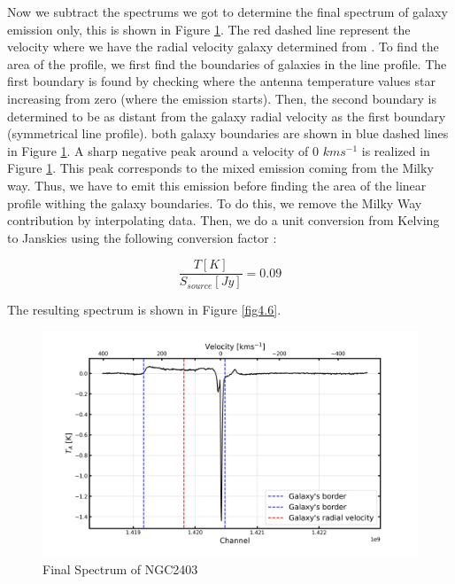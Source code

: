 \documentclass[12pt]{article}
\begin{document}
Now we subtract the spectrums we got to determine the final spectrum of galaxy emission only, this is shown in Figure \ref{fig4.5}. The red dashed line represent the velocity where we have the radial velocity galaxy determined from \cite{survey}.  
To find the area of the profile, we first find the boundaries of galaxies in the line profile. The first boundary is found by checking where the antenna temperature values star increasing from zero (where the emission starts). Then, the second boundary is determined to be as distant from the galaxy radial velocity as the first boundary (symmetrical line profile). both galaxy boundaries are shown in blue dashed lines in Figure \ref{fig4.5}. A sharp negative peak around a velocity of 0 $km s^{-1}$ is realized in Figure \ref{fig4.5}. This peak corresponds to the mixed emission coming from the Milky way. Thus, we have to emit this emission before finding the area of the linear profile withing the galaxy boundaries. To do this, we remove the Milky Way contribution by interpolating data. Then, we do a unit conversion from Kelving to Janskies using the following conversion factor \cite{lecturenote}:

\begin{equation}
    \frac{T[K]}{S_{source}[Jy]} = 0.09 
\end{equation}

The resulting spectrum is shown in Figure \ref{fig4.6}. 

\begin{figure}[H]
    \centering
    \includegraphics[width = \textwidth]{fig/sub.png}
    \caption{Final Spectrum of NGC2403}
    \label{fig4.5}
\end{figure}
\end{document}
